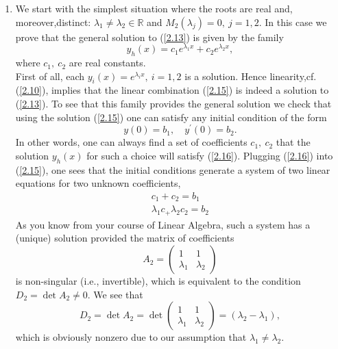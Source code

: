 \documentclass[11pt,a4paper]{article}
\begin{document}
	\begin{enumerate}
		\item We start with the simplest situation where the roots are real and, moreover,distinct: $\lambda_1 \neq \lambda_2 \in \mathbb{R}$ and $M_2(\lambda_j)=0,\ j=1,2$. In this case we prove that the general solution to (\ref{2.13}) is given by the family
		\begin{equation}\label{2.15}
			y_h(x) = c_1e^{\lambda_1x} + c_2e^{\lambda_2 x},
		\end{equation}
		where $c_1,\ c_2$ are real constants.\\
		First of all, each $y_i(x) = e^{\lambda_i x},\ i=1,2$ is a solution. Hence linearity,cf. (\ref{2.10}), implies that the linear combination (\ref{2.15}) is indeed a solution to (\ref{2.13}). To see that this family provides the general solution we check that using the solution (\ref{2.15}) one can satisfy any initial condition of the form
		\begin{equation}\label{2.16}
			y(0) = b_1,\quad y^\prime(0) = b_2.
		\end{equation}
		In other words, one can always find a set of coefficients $c_1,\ c_2$ that the solution $y_h(x)$ for such a choice will satisfy (\ref{2.16}). Plugging (\ref{2.16}) into (\ref{2.15}), one sees that the initial conditions generate a system of two linear equations for two unknown coefficients,
		\begin{equation}\label{2.17}
			\begin{gathered}
				c_1+c_2 = b_1\\
				\lambda_1c_ + \lambda_2c_2 = b_2
			\end{gathered}
		\end{equation}
		As you know from your course of Linear Algebra, such a system has a (unique) solution provided the matrix of coefficients
		\begin{equation}\label{2.18}
			A_2
			=
			\begin{pmatrix}
				1 & 1\\
				\lambda_1 & \lambda_2
			\end{pmatrix}
		\end{equation}
		is non-singular (i.e., invertible), which is equivalent to the condition $D_2 = \det A_2 \neq 0$. We see that
		$$
		D_2 = \det A_2 = \det
		\begin{pmatrix}
			1 & 1\\
			\lambda_1 & \lambda_2
		\end{pmatrix}
		= (\lambda_2-\lambda_1),
		$$
		which is obviously nonzero due to our assumption that $\lambda_1 \neq \lambda_2$.\\

\end{enumerate}
\end{document}
